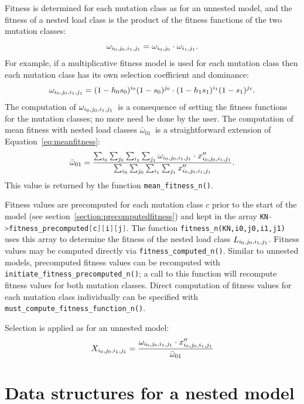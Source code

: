 \documentclass[10pt,twoside,a4paper,fleqn]{report}
\numberwithin{equation}{section}  %
\newcommand{\Lijij}{\mbox{$L_{i_0\/,j_0\/,i_1\/,j_1\/}$}}
\newcommand{\wnested}{\mbox{$\omega_{i_0\/,j_0\/,i_1\/,j_1\/}$}}
\newcommand{\meanwnested}{\mbox{$\bar{\omega}_{01}$}}
\newcommand{\xppijij}{\mbox{$x''_{i_0\/,j_0\/,i_1\/,j_1\/}$}}
\newcommand{\Xijij}{\mbox{$X_{i_0\/,j_0\/,i_1\/,j_1\/}$}}
\begin{document}
{Fitness is determined for each mutation class as for an unnested model, and the fitness of a nested load class is the product of the fitness functions of the two mutation classes:
\begin{equation}
\wnested = \omega_{i_0,j_0} \cdot \omega_{i_1,j_1}.
\end{equation}
For example, if a multiplicative fitness model is used for each mutation class then each mutation class has its own selection coefficient and dominance:
\begin{equation}
\wnested = (1-h_0 s_0)^{i_0}(1-s_0)^{j_0} \cdot (1-h_1 s_1)^{i_1}(1-s_1)^{j_1}.
\end{equation}
The computation of \wnested\ is a consequence of setting the fitness functions for the mutation classes; no more need be done by the user.  The computation of mean fitness with nested load classes \meanwnested\ is a straightforward extension of Equation~\eqref{eq:meanfitness}:
\begin{equation}\label{eq:meanfitnessnested}
\meanwnested = \frac{\sum_{i_0}{\sum_{j_0}{\sum_{i_1}{\sum_{j_1}{\wnested\cdot\xppijij}}}}}
               {\sum_{i_0}{\sum_{j_0}{\sum_{i_1}{\sum_{j_1}{\xppijij}}}}}.
\end{equation}
This value is returned by the function \lstinline{mean_fitness_n()}.

Fitness values are precomputed for each mutation class $c$\/ prior to the start of the model (see section~\ref{section:precomputedfitness}) and kept in the array \lstinline[language=C]{KN->fitness_precomputed[c][i][j]}.  The function \lstinline{fitness_n(KN,i0,j0,i1,j1)} uses this array to determine the fitness of the nested load class \Lijij.  Fitness values may be computed directly via \lstinline{fitness_computed_n()}.  Similar to unnested models, precomputed fitness values can be recomputed with \lstinline{initiate_fitness_precomputed_n()}; a call to this function will recompute fitness values for both mutation classes.  Direct computation of fitness values for each mutation class individually can be specified with \lstinline{must_compute_fitness_function_n()}.

Selection is applied as for an unnested model:
\begin{equation}\label{eq:selectionnested}
\Xijij = \frac{\wnested\cdot\xppijij}{\meanwnested}
\end{equation}

\section{Data structures for a nested model}

}
\end{document}
